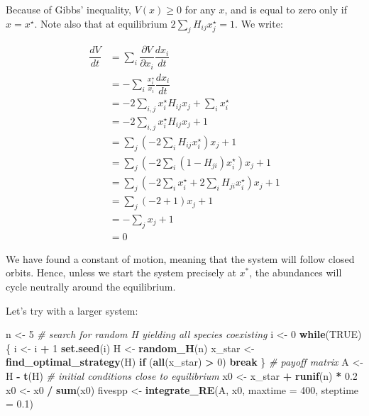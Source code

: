 \documentclass[]{book}
\newenvironment{Shaded}{\begin{snugshade}}{\end{snugshade}}
\newcommand{\CommentTok}[1]{\textcolor[rgb]{0.56,0.35,0.01}{\textit{#1}}}
\newcommand{\ControlFlowTok}[1]{\textcolor[rgb]{0.13,0.29,0.53}{\textbf{#1}}}
\newcommand{\DataTypeTok}[1]{\textcolor[rgb]{0.13,0.29,0.53}{#1}}
\newcommand{\DecValTok}[1]{\textcolor[rgb]{0.00,0.00,0.81}{#1}}
\newcommand{\FloatTok}[1]{\textcolor[rgb]{0.00,0.00,0.81}{#1}}
\newcommand{\KeywordTok}[1]{\textcolor[rgb]{0.13,0.29,0.53}{\textbf{#1}}}
\newcommand{\NormalTok}[1]{#1}
\newcommand{\OperatorTok}[1]{\textcolor[rgb]{0.81,0.36,0.00}{\textbf{#1}}}
\newcommand{\OtherTok}[1]{\textcolor[rgb]{0.56,0.35,0.01}{#1}}
\newcommand{\StringTok}[1]{\textcolor[rgb]{0.31,0.60,0.02}{#1}}
\begin{document}
Because of Gibbs' inequality, \(V(x) \geq 0\) for any \(x\), and is equal to zero only if \(x = x^\star\). Note also that at equilibrium \(2 \sum_j H_{ij} x_j^\star = 1\). We write:

\[
\begin{aligned}
  \dfrac{d V}{d t} &= \sum_i \dfrac{\partial V}{\partial x_i}
  \dfrac{d x_i}{d t}\\
  &= - \sum_i \frac{x_i^\star}{x_i} \dfrac{d x_i}{d t} \\
  &= -2 \sum_{i,j} x_i^\star H_{ij}x_j + \sum_i x_i^\star\\
  &= -2 \sum_{i,j} x_i^\star H_{ij}x_j + 1\\
  &= \sum_j \left(-2 \sum_i H_{ij}x_i^\star \right) x_j + 1\\
  &= \sum_j \left(-2 \sum_i (1 - H_{ji}) x_i^\star \right) x_j + 1\\
  &= \sum_j \left(-2 \sum_i x_i^\star + 2 \sum_i H_{ji} x_i^\star \right) x_j
  + 1 \\
  &= \sum_j \left(-2 + 1 \right) x_j  + 1 \\
  &=- \sum_j x_j + 1\\
  &= 0 
\end{aligned}
\]

We have found a constant of motion, meaning that the system will follow closed orbits. Hence, unless we start the system precisely at \(x^\ast\), the abundances will cycle neutrally around the equilibrium.

Let's try with a larger system:

\begin{Shaded}
\begin{Highlighting}[]
\NormalTok{n <-}\StringTok{ }\DecValTok{5}
\CommentTok{# search for random H yielding all species coexisting}
\NormalTok{i <-}\StringTok{ }\DecValTok{0}
\ControlFlowTok{while}\NormalTok{(}\OtherTok{TRUE}\NormalTok{)\{}
\NormalTok{  i <-}\StringTok{ }\NormalTok{i }\OperatorTok{+}\StringTok{ }\DecValTok{1}
  \KeywordTok{set.seed}\NormalTok{(i)}
\NormalTok{  H <-}\StringTok{ }\KeywordTok{random_H}\NormalTok{(n)}
\NormalTok{  x_star <-}\StringTok{ }\KeywordTok{find_optimal_strategy}\NormalTok{(H)}
  \ControlFlowTok{if}\NormalTok{ (}\KeywordTok{all}\NormalTok{(x_star) }\OperatorTok{>}\StringTok{ }\DecValTok{0}\NormalTok{) }\ControlFlowTok{break}
\NormalTok{\}}
\CommentTok{# payoff matrix}
\NormalTok{A <-}\StringTok{ }\NormalTok{H }\OperatorTok{-}\StringTok{ }\KeywordTok{t}\NormalTok{(H)}
\CommentTok{# initial conditions close to equilibrium}
\NormalTok{x0 <-}\StringTok{ }\NormalTok{x_star }\OperatorTok{+}\StringTok{ }\KeywordTok{runif}\NormalTok{(n) }\OperatorTok{*}\StringTok{ }\FloatTok{0.2}
\NormalTok{x0 <-}\StringTok{ }\NormalTok{x0 }\OperatorTok{/}\StringTok{ }\KeywordTok{sum}\NormalTok{(x0)}
\NormalTok{fivespp <-}\StringTok{ }\KeywordTok{integrate_RE}\NormalTok{(A, x0, }\DataTypeTok{maxtime =} \DecValTok{400}\NormalTok{, }\DataTypeTok{steptime =} \FloatTok{0.1}\NormalTok{)}
\end{Highlighting}
\end{Shaded}
\end{document}
